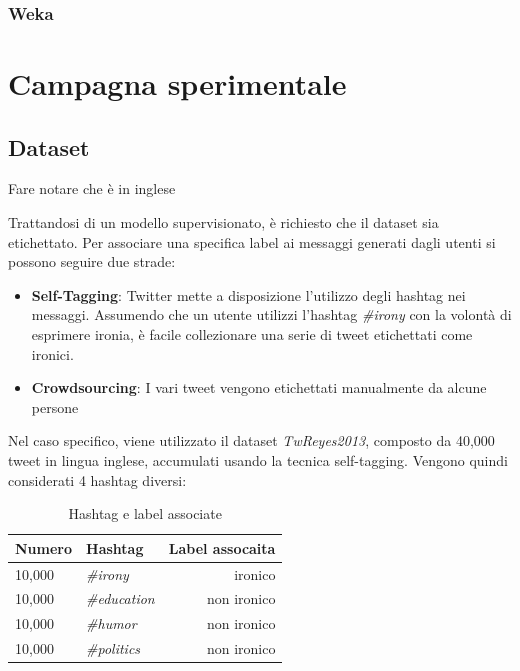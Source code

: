 \documentclass[oneside]{book}
\begin{document}
\subsection{Weka}




\chapter{Campagna sperimentale}

\section{Dataset}
Fare notare che è in inglese

Trattandosi di un modello supervisionato, è richiesto che il dataset sia etichettato. Per associare una specifica label ai messaggi generati dagli utenti si possono seguire due strade:

\begin{itemize}
	\item \textbf{Self-Tagging}:
	\label{chap:self-taggin}
	Twitter mette a disposizione l'utilizzo degli hashtag nei messaggi. Assumendo che un utente utilizzi l'hashtag \emph{\#irony} con la volontà di esprimere ironia, è facile collezionare una serie di tweet etichettati come ironici.
	
	\item \textbf{Crowdsourcing}:	
	I vari tweet vengono etichettati manualmente da alcune persone
\end{itemize}

Nel caso specifico, viene utilizzato il dataset \emph{TwReyes2013}, composto da 40,000 tweet in lingua inglese, accumulati usando la tecnica self-tagging. Vengono quindi considerati 4 hashtag diversi:


\begin{table}[ht]
	\centering
	\begin{tabular}[t]{llr}
		\hline
		\textbf{Numero} & \textbf{Hashtag}  & \textbf{Label assocaita}\\
		\hline
		10,000 & \emph{\#irony}     & ironico     \\
		10,000 & \emph{\#education} & non ironico \\
		10,000 & \emph{\#humor}     & non ironico \\
		10,000 & \emph{\#politics}  & non ironico \\
		\hline
	\end{tabular}
	\caption{Hashtag e label associate}
\end{table}%
\end{document}
